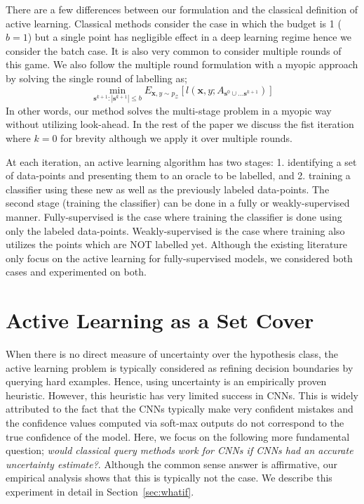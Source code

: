 \documentclass{article}
\begin{document}
There are a few differences between our formulation and the classical definition of active learning. Classical methods consider the case in which the budget is 1 ($b=1$) but a single point has negligible effect in a deep learning regime hence we consider the batch case. It is also very common to consider multiple rounds of this game. %
We also follow the multiple round formulation with a myopic approach by solving the single round of labelling as;
\begin{equation}
\min_{\mathbf{s}^{k+1} : |\mathbf{s}^{k+1}| \leq b} E_{\mathbf{x},y \sim p_\mathcal{Z}} [l(\mathbf{x},y;A_{\mathbf{s}^{0} \cup \ldots  \mathbf{s}^{k+1}})]
\end{equation}
In other words, our method solves the multi-stage problem in a myopic way without utilizing look-ahead. In the rest of the paper we discuss the fist iteration where $k=0$ for brevity although we apply it over multiple rounds. 

At each iteration, an active learning algorithm has two stages: 1. identifying a set of data-points and presenting them to an oracle to be labelled, and 2. training a classifier using these new as well as the previously labeled data-points. The second stage (training the classifier) can be done in a fully or weakly-supervised manner. Fully-supervised is the case where training the classifier is done using only the labeled data-points. Weakly-supervised is the case where training also utilizes the points which are NOT labelled yet. Although the existing literature only focus on the active learning for fully-supervised models, we considered both cases and experimented on both. 


\section{Active Learning as a Set Cover}
When there is no direct measure of uncertainty over the hypothesis class, the active learning problem is typically considered as refining decision boundaries by querying hard examples. Hence, using uncertainty is an empirically proven heuristic. However, this heuristic has very limited success in CNNs. This is widely attributed to the fact that the CNNs typically make very confident mistakes and the confidence values computed via soft-max outputs do not correspond to the true confidence of the model. Here, we focus on the following more fundamental question; \emph{would classical query methods work for CNNs if CNNs had an accurate uncertainty estimate?}. Although the common sense answer is affirmative, our empirical analysis shows that this is typically not the case. We describe this experiment in detail in Section~\ref{sec:whatif}.
\end{document}
